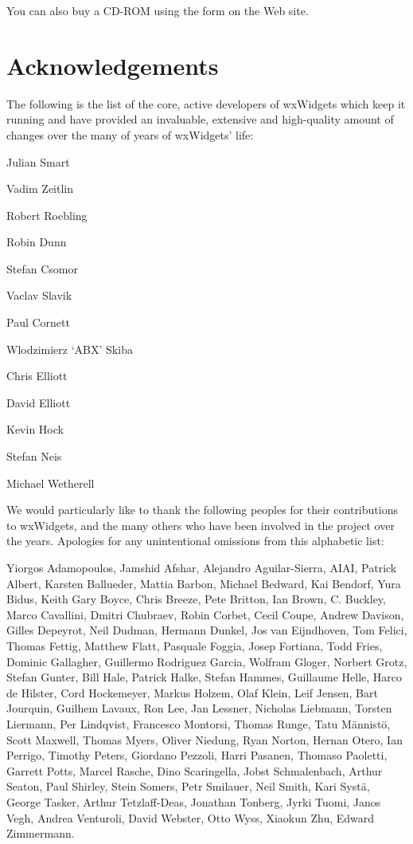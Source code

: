 You can also buy a CD-ROM using the form on the Web site.

\section{Acknowledgements}\label{acknowledgements}

The following is the list of the core, active developers of wxWidgets which keep
it running and have provided an invaluable, extensive and high-quality amount of
changes over the many of years of wxWidgets' life:

\begin{description}\itemsep=0pt
\item Julian Smart
\item Vadim Zeitlin
\item Robert Roebling
\item Robin Dunn
\item Stefan Csomor
\item Vaclav Slavik
\item Paul Cornett
\item Wlodzimierz `ABX' Skiba
\item Chris Elliott
\item David Elliott
\item Kevin Hock
\item Stefan Neis
\item Michael Wetherell
\end{description}

We would particularly like to thank the following peoples for their contributions 
to wxWidgets, and the many others who have been involved in the project over the years. 
Apologies for any unintentional omissions from this alphabetic list:
 
Yiorgos Adamopoulos, Jamshid Afshar, Alejandro Aguilar-Sierra, AIAI, 
Patrick Albert, Karsten Ballueder, Mattia Barbon, Michael Bedward, 
Kai Bendorf, Yura Bidus, Keith Gary Boyce, Chris Breeze, Pete Britton, 
Ian Brown, C. Buckley, Marco Cavallini, Dmitri Chubraev, Robin Corbet, Cecil Coupe, 
Andrew Davison, Gilles Depeyrot, Neil Dudman, Hermann Dunkel, Jos van Eijndhoven, 
Tom Felici, Thomas Fettig, Matthew Flatt, Pasquale Foggia, Josep Fortiana, Todd Fries, 
Dominic Gallagher, Guillermo Rodriguez Garcia, Wolfram Gloger, Norbert Grotz, 
Stefan Gunter, Bill Hale, Patrick Halke, Stefan Hammes, Guillaume Helle, 
Harco de Hilster, Cord Hockemeyer, Markus Holzem, Olaf Klein, Leif Jensen, 
Bart Jourquin, Guilhem Lavaux, Ron Lee, Jan Lessner, Nicholas Liebmann, 
Torsten Liermann, Per Lindqvist, Francesco Montorsi, Thomas Runge, Tatu M\"{a}nnist\"{o}, 
Scott Maxwell, Thomas Myers, Oliver Niedung, Ryan Norton, Hernan Otero, 
Ian Perrigo, Timothy Peters, Giordano Pezzoli, Harri Pasanen, Thomaso Paoletti, 
Garrett Potts, Marcel Rasche, Dino Scaringella, Jobst Schmalenbach, Arthur Seaton, 
Paul Shirley, Stein Somers, Petr Smilauer, Neil Smith, Kari Syst\"{a}, George Tasker, 
Arthur Tetzlaff-Deas, Jonathan Tonberg, Jyrki Tuomi, Janos Vegh, Andrea Venturoli, 
David Webster, Otto Wyss, Xiaokun Zhu, Edward Zimmermann.

